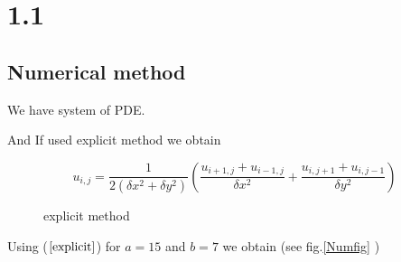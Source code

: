 

\section*{1.1}

\subsection*{Numerical method}
We have system of PDE.

And If used explicit method we obtain

\begin{equation}\label{explicit}
    u_{i, j} = \frac{1}{2(\delta x^2 + \delta y^2)} \left(\frac{u_{i+1,j} + u_{i-1,j}}{\delta x^2} + \frac{u_{i,j+1} + u_{i,j-1}}{\delta y^2}\right)
\end{equation}

\begin{figure}[h!]
\caption{explicit method}
\end{figure}

Using ($\ref{explicit}$)  for $a=15$ and $b=7$ we obtain (see fig.\ref{Numfig} )

